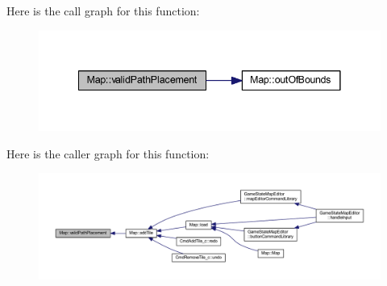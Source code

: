 Here is the call graph for this function\+:\nopagebreak
\begin{figure}[H]
\begin{center}
\leavevmode
\includegraphics[width=341pt]{class_map_a63a6d8a5e6bcbc1cc92cd29fcff638db_cgraph}
\end{center}
\end{figure}




Here is the caller graph for this function\+:\nopagebreak
\begin{figure}[H]
\begin{center}
\leavevmode
\includegraphics[width=350pt]{class_map_a63a6d8a5e6bcbc1cc92cd29fcff638db_icgraph}
\end{center}
\end{figure}




